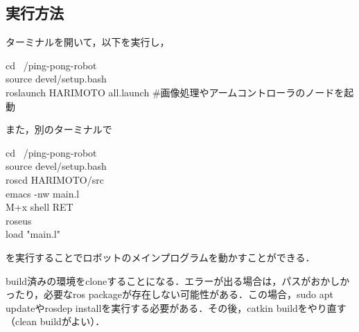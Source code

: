 \documentclass[10pt, oneside, titlepage]{ltjarticle}  %
\begin{document}
  \subsection{実行方法}
  ターミナルを開いて，以下を実行し，
  \begin{screen}
    cd ~/ping-pong-robot \\
    source devel/setup.bash \\
    roslaunch HARIMOTO all.launch \#画像処理やアームコントローラのノードを起動
  \end{screen}
  また，別のターミナルで
  \begin{screen}
    cd ~/ping-pong-robot\\
    source devel/setup.bash \\
    roscd HARIMOTO/src \\
    emacs -nw main.l \\
    M+x shell RET\\
    roseus \\
    load "main.l"
  \end{screen}
  を実行することでロボットのメインプログラムを動かすことができる．

  build済みの環境をcloneすることになる．エラーが出る場合は，パスがおかしかったり，必要なros packageが存在しない可能性がある．この場合，sudo apt updateやrosdep installを実行する必要がある．その後，catkin buildをやり直す（clean buildがよい）．
\end{document}
